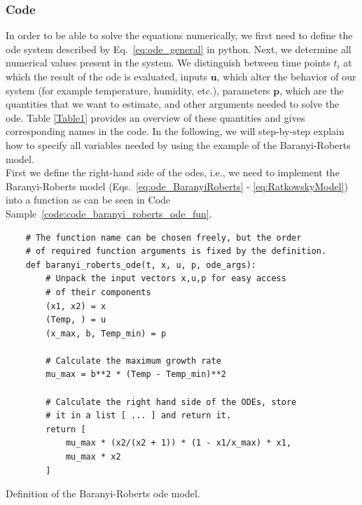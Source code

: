 \documentclass[graybox]{svmult}
\newcommand{\mbu}{\mathbf{u}}
\newcommand{\mbp}{\mathbf{p}}
\begin{document}
\subsubsection{Code}
In order to be able to solve the equations numerically, we first need to define the \ac{ode} system described by Eq.~\ref{eq:ode_general} in python.
Next, we determine all numerical values present in the system.
We distinguish between time points $t_i$ at which the result of the \ac{ode} is evaluated, inputs $\mbu$, which alter the behavior of our system (for example temperature, humidity, etc.), parameters $\mbp$, which are the quantities that we want to estimate, and other arguments needed to solve the \ac{ode}.
Table \ref{Table1} provides an overview of these quantities and gives corresponding names in the code.
In the following, we will step-by-step explain how to specify all variables needed by using the example of the Baranyi-Roberts model.\\
%
First we define the right-hand side of the \acp{ode}, i.e., we need to implement the Baranyi-Roberts model (Eqs.~\ref{eq:ode_BaranyiRoberts} - \ref{eq:RatkowskyModel}) into a function as can be seen in Code Sample~\ref{code:code_baranyi_roberts_ode_fun}.
\begin{code}[h]
    \begin{verbatim}
    # The function name can be chosen freely, but the order
    # of required function arguments is fixed by the definition.
    def baranyi_roberts_ode(t, x, u, p, ode_args):
        # Unpack the input vectors x,u,p for easy access
        # of their components
        (x1, x2) = x
        (Temp, ) = u
        (x_max, b, Temp_min) = p

        # Calculate the maximum growth rate
        mu_max = b**2 * (Temp - Temp_min)**2

        # Calculate the right hand side of the ODEs, store
        # it in a list [ ... ] and return it.
        return [
            mu_max * (x2/(x2 + 1)) * (1 - x1/x_max) * x1,
            mu_max * x2
        ]
    \end{verbatim}
    \caption{
        Definition of the Baranyi-Roberts \ac{ode} model.
    }
    \label{code:code_baranyi_roberts_ode_fun}
\end{code}
%
\end{document}
